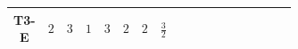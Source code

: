 \documentclass[8pt]{article}
\begin{document}
\begin{landscape}
\begin{longtable}{@{}cccccccc >{\raggedright\arraybackslash}p{0.21\linewidth} >{\raggedright\arraybackslash}p{0.21\linewidth} >{\raggedright\arraybackslash}p{0.21\linewidth}@{}}
T3-E & $2$ & $3$ & $1$ & $3$ & $2$ & $2$ & $\frac{3}{2}$ & \scriptsize\adjustbox{max width=\linewidth}{$\begin{gathered} +D_{\mu _1}\left(S_{2,j_1}\right){}^{\dagger } D_{\mu _1}\left(S_{2,j_1}\right)\end{gathered}$} & \scriptsize\adjustbox{max width=\linewidth}{$\begin{gathered} -\overline{F_{j_1,r_1}}\, F_{j_1,r_1} M_F\end{gathered}$} & \scriptsize\adjustbox{max width=\linewidth}{$\begin{gathered} +i \overline{F_{j_1,r_1}}\, \gamma ^{\mu _1}\, D_{\mu _1}\left(F_{j_1,r_1}\right)\end{gathered}$} \\
\midrule
\bottomrule
\end{longtable}
\clearpage

\end{landscape}
\end{document}
